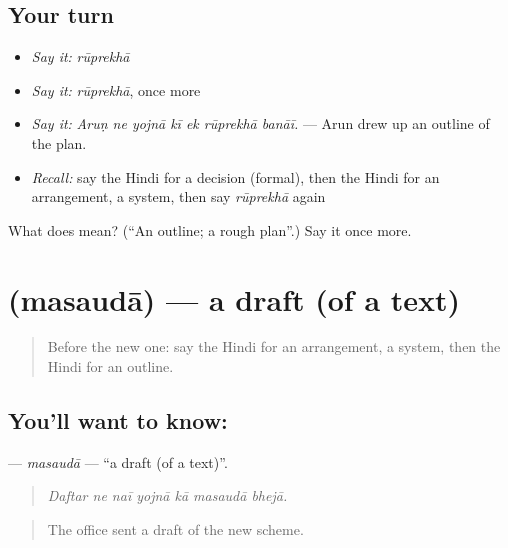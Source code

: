\subsection*{Your turn}
\begin{itemize}
\raggedright
  \item \emph{Say it:} \emph{rūprekhā}
  \item \emph{Say it:} \emph{rūprekhā}, once more
  \item \emph{Say it:} \emph{Aruṇ ne yojnā kī ek rūprekhā banāī.} — Arun drew up an outline of the plan.
  \item \emph{Recall:} say the Hindi for a decision (formal), then the Hindi for an arrangement, a system, then say \emph{rūprekhā} again
\end{itemize}

\begin{tcolorbox}[breakable,colback=teal!4,colframe=teal!35!black,title={Before you move on}]
What does  mean? (\textquotedblleft{}An outline; a rough plan\textquotedblright{}.) Say it once more.
\end{tcolorbox}
\section[\texorpdfstring{\hi{मसौदा} (masaudā)}{मसौदा (masaudā)}]{ (masaudā) — a draft (of a text)}

\label{lesson:HI-C536-masauda}



\begin{quote}
Before the new one: say the Hindi for an arrangement, a system, then the Hindi for an outline.
\end{quote}

\subsection*{You'll want to know: }
\textbf{} — \emph{masaudā} — \textquotedblleft{}a draft (of a text)\textquotedblright{}.

\begin{quote}
      
\end{quote}

\begin{quote}
\emph{Daftar ne naī yojnā kā masaudā bhejā.}
\end{quote}

\begin{quote}
The office sent a draft of the new scheme.
\end{quote}

